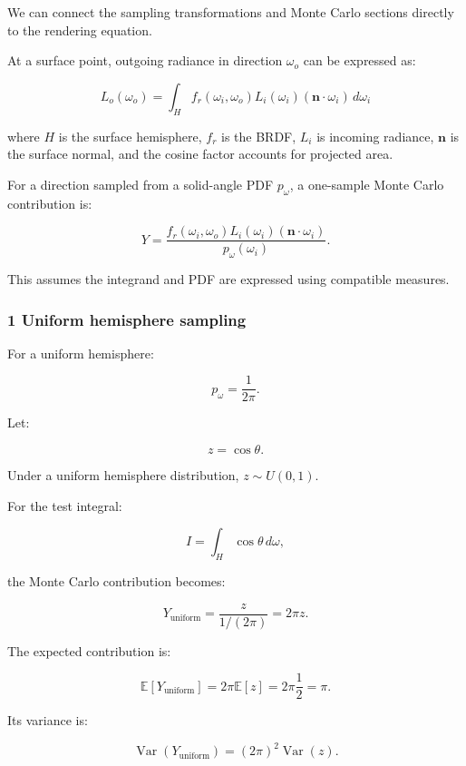 \hypertarget{02-foundations-ii-ch031-an-exact-rendering-example-cosine-weighted-hemisphere-sampling}{}

We can connect the sampling transformations and Monte Carlo sections directly to the rendering equation.

At a surface point, outgoing radiance in direction \(\omega_o\) can be expressed as:

\[
 \boxed{ L_o(\omega_o) = \int_H f_r(\omega_i,\omega_o) L_i(\omega_i) (\mathbf n\cdot\omega_i)\,d\omega_i }
\]

where \(H\) is the surface hemisphere, \(f_r\) is the BRDF, \(L_i\) is incoming radiance, \(\mathbf n\) is the surface normal, and the cosine factor accounts for projected area.

For a direction sampled from a solid-angle PDF \(p_\omega\), a one-sample Monte Carlo contribution is:

\[
 \boxed{ Y= \frac{ f_r(\omega_i,\omega_o) L_i(\omega_i) (\mathbf n\cdot\omega_i) }{ p_\omega(\omega_i) } }.
\]

This assumes the integrand and PDF are expressed using compatible measures.

\subsubsection{1 Uniform hemisphere sampling}\label{02-foundations-ii-ch031-uniform-hemisphere-sampling}

\hypertarget{02-foundations-ii-ch031-uniform-hemisphere-sampling}{}

For a uniform hemisphere:

\[
 p_\omega=\frac1{2\pi}.
\]

Let:

\[
 z=\cos\theta.
\]

Under a uniform hemisphere distribution, \(z\sim U(0,1)\).

For the test integral:

\[
 I=\int_H\cos\theta\,d\omega,
\]

the Monte Carlo contribution becomes:

\[
 Y_{\mathrm{uniform}} = \frac z{1/(2\pi)} =2\pi z.
\]

The expected contribution is:

\[
 \mathbb E[Y_{\mathrm{uniform}}] = 2\pi\mathbb E[z] =2\pi\frac12 =\pi.
\]

Its variance is:

\[
 \operatorname{Var}(Y_{\mathrm{uniform}}) = (2\pi)^2\operatorname{Var}(z).
\]

